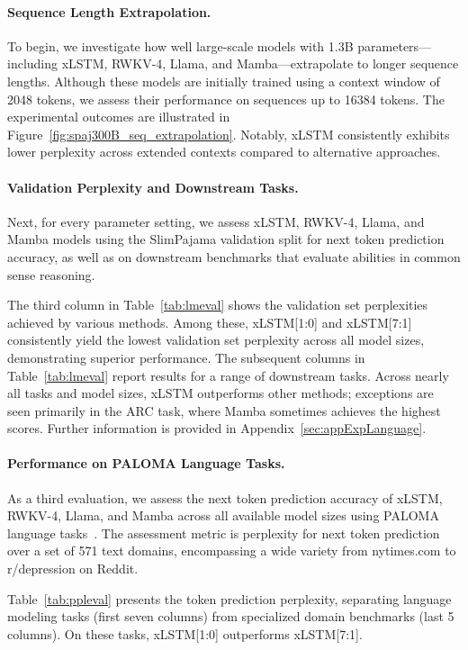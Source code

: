 \paragraph{Sequence Length Extrapolation.}
\label{sec:spaj300B_ctx_extrapolation}
To begin, we investigate how well large-scale models with 1.3B parameters—including xLSTM, RWKV-4, Llama, and Mamba—extrapolate to longer sequence lengths. Although these models are initially trained using a context window of 2048 tokens, we assess their performance on sequences up to 16384 tokens. The experimental outcomes are illustrated in Figure~\ref{fig:spaj300B_seq_extrapolation}. Notably, xLSTM consistently exhibits lower perplexity across extended contexts compared to alternative approaches.

\paragraph{Validation Perplexity and Downstream Tasks.}
\label{sec:spaj_downstream_eval}
Next, for every parameter setting, we assess xLSTM, RWKV-4, Llama, and Mamba models using the SlimPajama validation split for next token prediction accuracy, as well as on downstream benchmarks that evaluate abilities in common sense reasoning.

The third column in Table~\ref{tab:lmeval} shows the validation set perplexities achieved by various methods. Among these, xLSTM[1:0] and xLSTM[7:1] consistently yield the lowest validation set perplexity across all model sizes, demonstrating superior performance. The subsequent columns in Table~\ref{tab:lmeval} report results for a range of downstream tasks. Across nearly all tasks and model sizes, xLSTM outperforms other methods; exceptions are seen primarily in the ARC task, where Mamba sometimes achieves the highest scores. Further information is provided in Appendix~\ref{sec:appExpLanguage}.

\paragraph{Performance on PALOMA Language Tasks.} As a third evaluation, we assess the next token prediction accuracy of xLSTM, RWKV-4, Llama, and Mamba across all available model sizes using PALOMA language tasks~\citep{Magnusson:23arxivshort}. The assessment metric is perplexity for next token prediction over a set of 571 text domains, encompassing a wide variety from nytimes.com to r/depression on Reddit. 

Table~\ref{tab:ppleval} presents the token prediction perplexity, separating language modeling tasks (first seven columns) from specialized domain benchmarks (last 5 columns). On these tasks, xLSTM[1:0] outperforms xLSTM[7:1].

